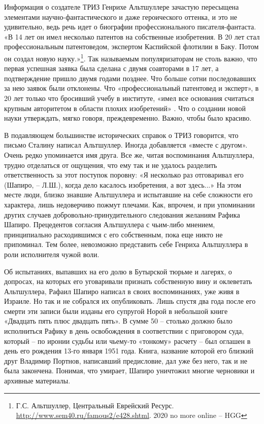 \documentclass[11pt,a4paper]{article}
\begin{document}
Информация о создателе ТРИЗ Генрихе Альтшуллере зачастую пересыщена элементами
научно-фантастического и даже героического оттенка, и это не удивительно, ведь
речь идет о биографии профессионального писателя-фантаста.  «В 14 лет он имел
несколько патентов на собственные изобретения. В 20 лет стал профессиональным
патентоведом, экспертом Каспийской флотилии в Баку. Потом он создал новую
науку.»\footnote{Г.С. Альтшуллер, Центральный Еврейский Ресурс.
  \url{http://www.sem40.ru/famous2/e428.shtml}.  2020 no more online -- HGG}.
Так называемым популяризаторам не столь важно, что первая успешная заявка была
сделана с двумя соавторами в 17 лет, а подтверждение пришло двумя годами
позднее. Что больше сотни последовавших за нею заявок были отклонены. Что
«профессиональный патентовед и эксперт», в 20 лет только что бросивший учебу в
институте, «имел все основания считаться крупным авторитетом в области плохих
изобретений» \cite{Altshuller1961}. Что о создании новой науки утверждать,
мягко говоря, преждевременно. Важно, чтобы было красиво.

В подавляющем большинстве исторических справок о ТРИЗ говорится, что письмо
Сталину написал Альтшуллер. Иногда добавляется «вместе с другом». Очень редко
упоминается имя друга. Все же, читая воспоминания Альтшуллера, трудно
отделаться от ощущения, что ему так и не удалось разделить ответственность за
этот поступок поровну: «Я несколько раз отговаривал его (Шапиро, -- Л.Ш.),
когда дело касалось изобретения, а вот здесь...» На этом месте люди, близко
знавшие Альтшуллера и испытавшие на себе сложности его характера, лишь
недоверчиво пожмут плечами. Как, впрочем, и при упоминании других случаев
добровольно-принудительного следования желаниям Рафика Шапиро. Прецедентов
согласия Альтшуллера с чьим-либо мнением, принципиально расходившимся с его
собственным, пока еще никто не припоминал. Тем более, невозможно представить
себе Генриха Альтшуллера в роли исполнителя чужой воли.

Об испытаниях, выпавших на его долю в Бутырской тюрьме и лагерях, о допросах,
на которых его уговаривали признать собственную вину и оклеветать Альтшуллера,
Рафаил Шапиро написал в своих воспоминаниях, уже живя в Израиле. Но так и не
собрался их опубликовать. Лишь спустя два года после его смерти эти записи
были изданы его супругой Норой в небольшой книге «Двадцать пять плюс двадцать
пять». В сумме 50 -- столько должно было исполниться Рафику в день
освобождения в соответствии с приговором суда, который -- по иронии судьбы или
чьему-то «тонкому» расчету -- был оглашен в день его рождения 13-го января
1951 года. Книга, название которой его близкий друг Владимир Портнов,
написавший предисловие, дал уже без него, так и не была закончена. Понимая,
что умирает, Шапиро уничтожил многие черновики и архивные материалы.
\end{document}
